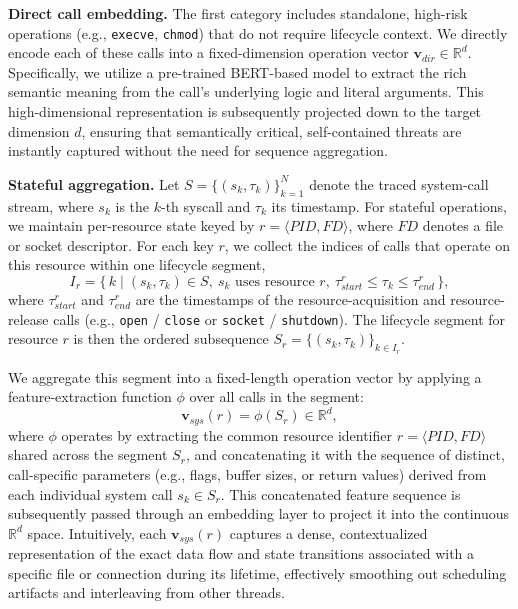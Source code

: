 \noindent \textbf{Direct call embedding.} The first category includes standalone, high-risk operations (e.g., \texttt{execve}, \texttt{chmod}) that do not require lifecycle context. We directly encode each of these calls into a fixed-dimension operation vector $\mathbf{v}_{\textit{dir}} \in \mathbb{R}^{d}$. Specifically, we utilize a pre-trained BERT-based model to extract the rich semantic meaning from the call's underlying logic and literal arguments. This high-dimensional representation is subsequently projected down to the target dimension $d$, ensuring that semantically critical, self-contained threats are instantly captured without the need for sequence aggregation.

\noindent \textbf{Stateful aggregation.} Let $S = \{(s_k, \tau_k)\}_{k=1}^{N}$ denote the traced system-call stream, where $s_k$ is the $k$-th syscall and $\tau_k$ its timestamp. For stateful operations, we maintain per-resource state keyed by $r = \langle \textit{PID}, \textit{FD} \rangle$, where $\textit{FD}$ denotes a file or socket descriptor. For each key $r$, we collect the indices of calls that operate on this resource within one lifecycle segment,
\begin{equation}
I_r = \{\, k \mid (s_k, \tau_k) \in S,\ s_k \text{ uses resource } r,\ \tau_{\textit{start}}^r \le \tau_k \le \tau_{\textit{end}}^r \,\},
\end{equation}
where $\tau_{\textit{start}}^r$ and $\tau_{\textit{end}}^r$ are the timestamps of the resource-acquisition and resource-release calls (e.g., \texttt{open} / \texttt{close} or \texttt{socket} / \texttt{shutdown}). The lifecycle segment for resource $r$ is then the ordered subsequence $S_r = \{(s_k, \tau_k)\}_{k \in I_r}$.

We aggregate this segment into a fixed-length operation vector by applying a feature-extraction function $\phi$ over all calls in the segment:
\begin{equation}
\mathbf{v}_{\textit{sys}}(r) = \phi(S_r) \in \mathbb{R}^{d},
\end{equation}
where $\phi$ operates by extracting the common resource identifier $r = \langle \textit{PID}, \textit{FD} \rangle$ shared across the segment $S_r$, and concatenating it with the sequence of distinct, call-specific parameters (e.g., flags, buffer sizes, or return values) derived from each individual system call $s_k \in S_r$. This concatenated feature sequence is subsequently passed through an embedding layer to project it into the continuous $\mathbb{R}^{d}$ space. Intuitively, each $\mathbf{v}_{\textit{sys}}(r)$ captures a dense, contextualized representation of the exact data flow and state transitions associated with a specific file or connection during its lifetime, effectively smoothing out scheduling artifacts and interleaving from other threads.


